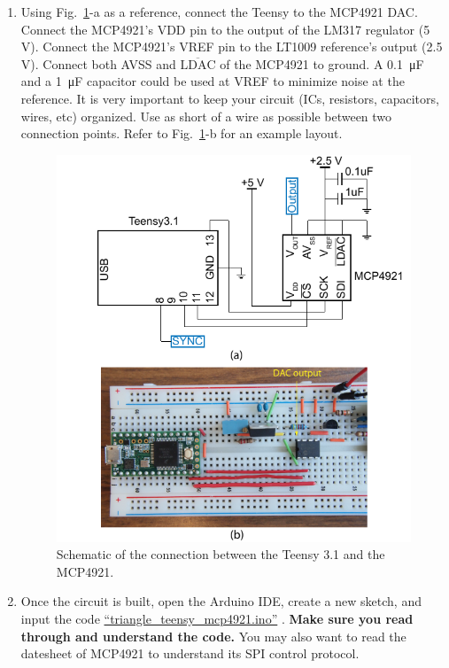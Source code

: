 \documentclass[letterpaper, 11pt]{article}
\begin{document}
\begin{enumerate}
	\item Using Fig.~\ref{fig:dac-sch}-a as a reference, connect the Teensy to the MCP4921 DAC. Connect the MCP4921's VDD pin to the output of the LM317 regulator (5\,V). Connect the MCP4921's VREF pin to the LT1009 reference's output (2.5\,V). Connect both AVSS and $\overline{\text{LDAC}}$ of the MCP4921 to ground. A \SI{0.1}{\micro\farad} and a \SI{1}{\micro\farad} capacitor could be used at VREF to minimize noise at the reference. It is very important to keep your circuit (ICs, resistors, capacitors, wires, etc) organized. Use as short of a wire as possible between two connection points. Refer to Fig.~\ref{fig:dac-sch}-b for an example layout.
	
	\begin{figure}[h]
		\centering
		\includegraphics{dac-sch}
		\caption{Schematic of the connection between the Teensy 3.1 and the MCP4921.}
		\label{fig:dac-sch}
	\end{figure}

\item Once the circuit is built, open the Arduino IDE, create a new sketch, and input the code \href{https://github.com/ucdart/UCD-EEC134/blob/master/Lab1/triangle.ino}{``triangle\_teensy\_mcp4921.ino''} . \textbf{Make sure you read through and understand the code.} You may also want to read the datesheet of MCP4921 to understand its SPI control protocol. 


\end{enumerate}
\end{document}
